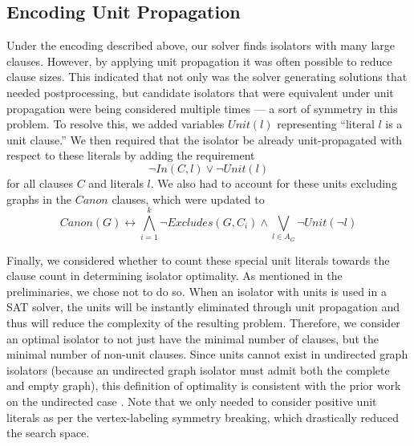 \documentclass[conference]{IEEEtran}
\begin{document}
\subsection{Encoding Unit Propagation}

Under the encoding described above, our solver finds isolators with many large clauses. However, by applying unit propagation it was often possible to reduce clause sizes. This indicated that not only was the solver generating solutions that needed postprocessing, but candidate isolators that were equivalent under unit propagation were being considered multiple times --- a sort of symmetry in this problem.  To resolve this, we added variables $\mathit{Unit}(l)$ representing ``literal $l$ is a unit clause.'' We then required that the isolator be already unit-propagated with respect to these literals by adding the requirement
$$\lnot \mathit{In}(C, l) \lor \lnot \mathit{Unit}(l)$$
for all clauses $C$ and literals $l$. We also had to account for these units excluding graphs in the $\mathit{Canon}$ clauses, which were updated to
$$\mathit{Canon}(G) \leftrightarrow \bigwedge\limits_{i=1}^k \lnot \mathit{Excludes}(G,C_i) \land \bigvee\limits_{l \in A_G}\lnot \mathit{Unit}(\lnot l)$$


Finally, we considered whether to count these special unit literals towards the clause count in determining isolator optimality. As mentioned in the preliminaries, we chose not to do so. When an isolator with units is used in a SAT solver, the units will be instantly eliminated through unit propagation and thus will reduce the complexity of the resulting problem.  Therefore, we consider an optimal isolator to not just have the minimal number of clauses, but the minimal number of non-unit clauses.  Since units cannot exist in undirected graph isolators (because an undirected graph isolator must admit both the complete and empty graph), this definition of optimality is consistent with the prior work on the undirected case \cite{ref_heule}. Note that we only needed to consider positive unit literals as per the vertex-labeling symmetry breaking, which drastically reduced the search space.

\end{document}
